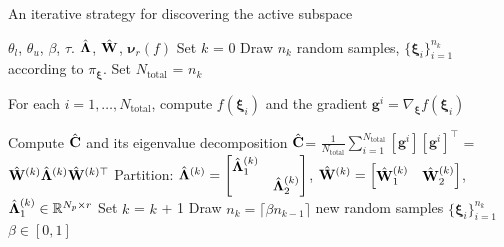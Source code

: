 \bigskip
\begin{breakablealgorithm}
\renewcommand{\algorithmicrequire}{\textbf{Input:}}
\renewcommand{\algorithmicensure}{\textbf{Output:}}
  \caption{An iterative strategy for discovering the active subspace}
  \begin{algorithmic}[1]
\Require $\theta_l$, $\theta_u$, $\beta$, $\tau$. 
\Ensure $\hat{\mathbf{{\Lambda}}}$, $\hat{\mathbf{{W}}}$, $\bm{\nu}_r(f)$ %
    \State Set $k$ = 0
	\State Draw $n_k$ random samples, $\{\bm{\xi}_i\}_{i=1}^{n_k}$ 
         according to $\pi_{\bm{\xi}}$. 
    \State Set $N_\text{total}$ = $n_k$ 

	\State For each $i=1, \ldots, N_\text{total}$, compute $f(\bm{\xi}_i)$ and the gradient $\bm{g}^i = \nabla_{\bm{\xi}}f(\bm{\xi}_i)$

	\State Compute $\hat{\mathbf{{C}}}$ and its eigenvalue decomposition 
		$\hat{\mathbf{{C}}}$= $\frac{1}{N_\text{total}}\sum\limits_{i=1}^{N_\text{total}}[\bm{g}^i][\bm{g}^i]^\top$ = 
		$\hat{\mathbf{{W}}}^{(k)}\hat{\mathbf{{\Lambda}}}^{(k)} \hat{\mathbf{{W}}}^{(k)\top}$
	\State Partition: $\hat{\mathbf{{\Lambda}}}^{(k)}=
        \begin{bmatrix} \hat{\mathbf{{\Lambda}}}_1^{(k)} & \\ & \hat{\mathbf{{\Lambda}}}_2^{(k)} \end{bmatrix}$, 
        $\hat{\mathbf{{W}}}^{(k)}=\begin{bmatrix} \hat{\mathbf{{W}}}_1^{(k)} & \hat{\mathbf{{W}}}_2^{(k)} \end{bmatrix}$, 
        $\hat{\mathbf{{\Lambda}}}_1^{(k)}\in \mathbb{R}^{N_p\times r}$
	\Loop
		\State Set $k$ = $k$ + 1
		\State Draw $n_k =  \lceil\beta n_{k-1}\rceil$  new random samples 
                $\{\bm{\xi}_i\}_{i=1}^{n_k}$  $\beta\in[0,1]$
                

\end{algorithmic}
\end{breakablealgorithm}

